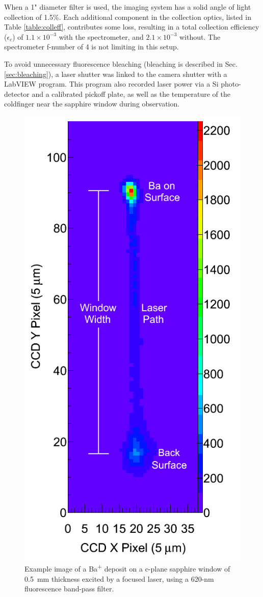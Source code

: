 When a 1" diameter filter is used, the imaging system has a solid angle of light collection of 1.5\%.  Each additional component in the collection optics, listed in Table \ref{table:colleff}, contributes some loss, resulting in a total collection efficiency ($\epsilon_{c}$) of $1.1 \times 10^{-3}$ with the spectrometer, and $2.1 \times 10^{-3}$ without.  The spectrometer f-number of 4 is not limiting in this setup.


To avoid unnecessary fluorescence bleaching (bleaching is described in Sec. \ref{sec:bleaching}), a laser shutter was linked to the camera shutter with a LabVIEW program.  This program also recorded laser power via a Si photo-detector and a calibrated pickoff plate, as well as the temperature of the coldfinger near the sapphire window during observation.


\begin{figure} %
        \centering
                \includegraphics[width=.4\textwidth]{figures/imageExamp.png}
                \caption{Example image of a Ba\textsuperscript{+} deposit on a c-plane sapphire window of 0.5~mm thickness excited by a focused laser, using a 620-nm fluorescence band-pass filter.}
\label{fig:imageexamp}
\end{figure}

